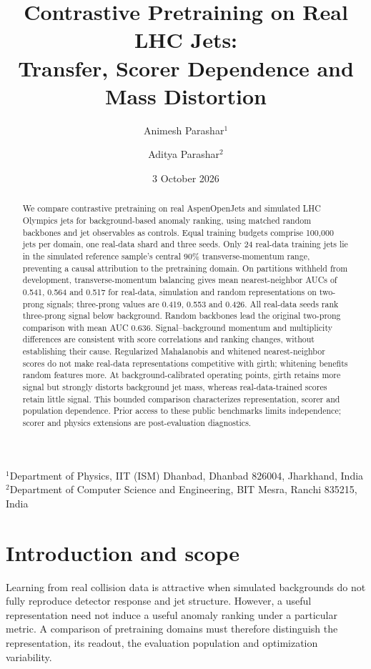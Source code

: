 \documentclass[11pt,a4paper]{article}
\title{Contrastive Pretraining on Real LHC Jets:\\Transfer, Scorer Dependence and Mass Distortion}
\author{Animesh Parashar$^1$ \and Aditya Parashar$^2$}
\date{3 October 2026}
\begin{document}
\maketitle
\begin{center}\small
$^1$Department of Physics, IIT (ISM) Dhanbad, Dhanbad 826004, Jharkhand, India\\
$^2$Department of Computer Science and Engineering, BIT Mesra, Ranchi 835215, India
\end{center}
\begin{abstract}
We compare contrastive pretraining on real AspenOpenJets and simulated LHC Olympics
jets for background-based anomaly ranking, using matched random backbones and jet
observables as controls. Equal training budgets comprise 100,000 jets per domain,
one real-data shard and three seeds. Only 24 real-data training jets lie in the
simulated reference sample's central 90\% transverse-momentum range, preventing a
causal attribution to the pretraining domain. On partitions withheld from
development, transverse-momentum balancing gives mean nearest-neighbor AUCs of
0.541, 0.564 and 0.517 for real-data, simulation and random representations on
two-prong signals; three-prong values are 0.419, 0.553 and 0.426. All real-data seeds
rank three-prong signal below background. Random backbones lead the original
two-prong comparison with mean AUC 0.636. Signal--background momentum and
multiplicity differences are consistent with score correlations and ranking
changes, without establishing their cause. Regularized Mahalanobis and whitened
nearest-neighbor scores do not make real-data representations competitive with
girth; whitening benefits random features more. At background-calibrated operating
points, girth retains more signal but strongly distorts background jet mass,
whereas real-data-trained scores retain little signal. This bounded comparison
characterizes representation, scorer and population dependence. Prior access to
these public benchmarks limits independence; scorer and physics extensions are
post-evaluation diagnostics.
\end{abstract}

\section{Introduction and scope}
Learning from real collision data is attractive when simulated backgrounds do
not fully reproduce detector response and jet structure. However, a useful
representation need not induce a useful anomaly ranking under a particular
metric. A comparison of pretraining domains must therefore distinguish the
representation, its readout, the evaluation population and optimization variability.
\end{document}
